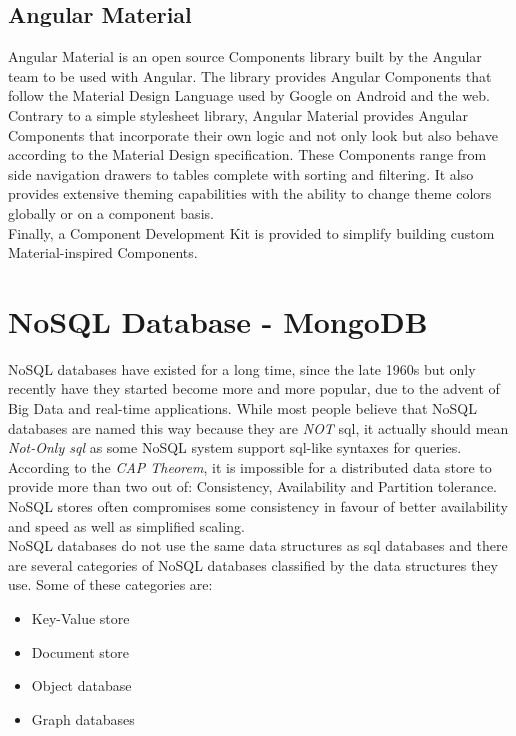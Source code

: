 \documentclass[twoside, openright,11pt,a4paper]{book}
\begin{document}
\subsection{Angular Material}
Angular Material\cite{angular:material:website} is an open source\cite{github:angular:material} Components library built by the Angular team to be used with Angular. The library provides Angular Components that follow the Material Design Language\cite{material:website} used by Google on Android and the web.\\

Contrary to a simple stylesheet library, Angular Material provides Angular Components that incorporate their own logic and not only look but also behave according to the Material Design specification. These Components range from side navigation drawers to tables complete with sorting and filtering. It also provides extensive theming capabilities with the ability to change theme colors globally or on a component basis. \\

Finally, a Component Development Kit is provided to simplify building custom Material-inspired Components.
\section{NoSQL Database - MongoDB}
NoSQL databases\cite{wiki:nosql} have existed for a long time, since the late 1960s but only recently have they started become more and more popular, due to the advent of Big Data and real-time applications. While most people believe that NoSQL databases are named this way because they are \emph{NOT} \gls{sql}, it actually should mean \emph{Not-Only \gls{sql}} as some NoSQL system support \gls{sql}-like syntaxes for queries. \\

According to the \emph{CAP Theorem}\cite{wiki:cap_theorem}, it is impossible for a distributed data store to provide more than two out of: Consistency, Availability and Partition tolerance. NoSQL stores often compromises some consistency in favour of better availability and speed as well as simplified scaling. \\ 

NoSQL databases do not use the same data structures as \gls{sql} databases and there are several categories of NoSQL databases classified by the data structures they use. Some of these categories are:
\begin{itemize}
	\item Key-Value store
	\item Document store
	\item Object database
	\item Graph databases
\end{itemize}
\end{document}
